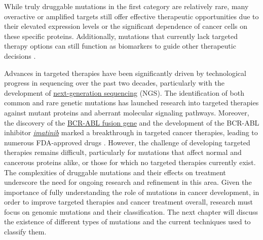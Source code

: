 While truly druggable mutations in the first category are relatively rare, many overactive or amplified targets still offer effective therapeutic opportunities due to their elevated expression levels or the significant dependence of cancer cells on these specific proteins. Additionally, mutations that currently lack targeted therapy options can still function as biomarkers to guide other therapeutic decisions \cite{jci}.

Advances in targeted therapies have been significantly driven by technological progress in sequencing over the past two decades, particularly with the development of \href{https://en.wikipedia.org/wiki/Massive_parallel_sequencing}{next-generation sequencing} (NGS). The identification of both common and rare genetic mutations has launched research into targeted therapies against mutant proteins and aberrant molecular signaling pathways. Moreover, the discovery of the \href{https://en.wikipedia.org/wiki/Philadelphia_chromosome}{BCR-ABL fusion gene} and the development of the BCR-ABL inhibitor \href{https://en.wikipedia.org/wiki/Imatinib}{\textit{imatinib}} marked a breakthrough in targeted cancer therapies, leading to numerous FDA-approved drugs \cite{jci}. However, the challenge of developing targeted therapies remains difficult, particularly for mutations that affect normal and cancerous proteins alike, or those for which no targeted therapies currently exist. The complexities of druggable mutations and their effects on treatment underscore the need for ongoing research and refinement in this area. Given the importance of fully understanding the role of mutations in cancer development, in order to improve targeted therapies and cancer treatment overall, research must focus on genomic mutations and their classification. The next chapter will discuss the existence of different types of mutations and the current techniques used to classify them.

\cleardoublepage

